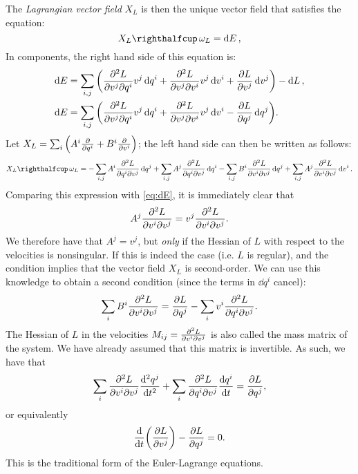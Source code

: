 The \emph{Lagrangian vector field} \(X_L\) is then the unique vector field that satisfies the equation: \cite{Godbillon1969}
\begin{equation}
    \intpr{X_L}{\omega_L} = \dd{E},
    \label{eq:EL_nocomp}
\end{equation}
In components, the right hand side of this equation is:
\begin{equation}
    \begin{split}
        \dd{E} &= \sum_{i, j}\qty(\pdv[2]{L}{v^j}{q^i}v^j\dd{q^i} + \pdv[2]{L}{v^j}{v^i}v^j\dd{v^i} + \pdv{L}{v^j}\dd{v^j}) - \dd{L}, \\
        \dd{E} &= \sum_{i, j}\qty(\pdv[2]{L}{v^j}{q^i}v^j\dd{q^i} + \pdv[2]{L}{v^j}{v^i}v^j\dd{v^i} - \pdv{L}{q^j}\dd{q^j}).
    \end{split}
    \label{eq:dE}
\end{equation}
Let \(X_L = \sum_i \qty( A^i \pdv{}{q^i} + B^i\pdv{}{v^i}) \); the left hand side can then be written as follows:
\begin{equation}
    \intpr{X_L}{\omega_L} =  - \sum_{i,j} A^i \pdv[2]{L}{q^i}{v^j}\dd{q^j} 
                             + \sum_{i,j} A^j \pdv[2]{L}{q^i}{v^j}\dd{q^i} 
                             - \sum_{i, j} B^i \pdv[2]{L}{v^i}{v^j}\dd{q^j}
                             + \sum_{i, j} A^j \pdv[2]{L}{v^i}{v^j}\dd{v^i}.
\end{equation}
Comparing this expression with \cref{eq:dE}, it is immediately clear that
\begin{equation}
     A^j \pdv[2]{L}{v^i}{v^j} = v^j \pdv[2]{L}{v^i}{v^j}.
\end{equation}
We therefore have that \(A^j = v^j\), but \emph{only} if the Hessian of \(L\) with respect to the velocities is nonsingular. If this is indeed the case (i.e. \(L\) is regular), and the condition implies that the vector field \(X_L\) is second-order. We can use this knowledge to obtain a second condition (since the terms in \(\dd{q^i}\) cancel): 
\begin{equation}
     \sum_{i} B^i \pdv[2]{L}{v^i}{v^j} = \pdv{L}{q^j} - \sum_{i} v^i \pdv[2]{L}{q^i}{v^j}.
\end{equation}
The Hessian of \(L\) in the velocities \(M_{ij} = \pdv[2]{L}{v^i}{v^j}\) is also called the mass matrix of the system. We have already assumed that this matrix is invertible. As such, we have that
\begin{equation}
     \sum_{i}\pdv[2]{L}{v^i}{v^j}\dv[2]{q^j}{t} + \sum_{i} \pdv[2]{L}{q^i}{v^j}\dv{q^i}{t} = \pdv{L}{q^j},
\end{equation}
or equivalently
\begin{equation}
     \dv{}{t}\qty(\pdv{L}{v^j}) - \pdv{L}{q^j} = 0.
\end{equation}
This is the traditional form of the Euler-Lagrange equations.

